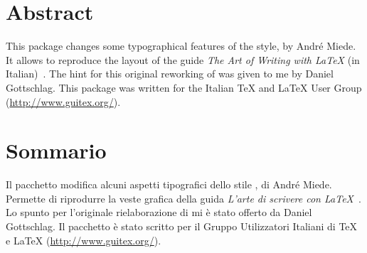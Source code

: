 
\begingroup
\let\clearpage\relax
\let\cleardoublepage\relax
\let\cleardoublepage\relax

\chapter*{Abstract}
This package changes some typographical features of the \classicthesis{} style, by André Miede. It allows to reproduce the layout of the guide \emph{The Art of Writing with \LaTeX} (in Italian)~\citep{pantieri:art}.  The hint for this original reworking of \classicthesis{} was given to me by Daniel Gottschlag. This package was written for the Italian \TeX{} and \LaTeX{} User Group (\url{http://www.guitex.org/}).

\vfill

\chapter*{Sommario}
Il pacchetto modifica alcuni aspetti tipografici dello stile \classicthesis, di André Miede. Permette di riprodurre la veste grafica della guida \emph{L'arte di scrivere con \LaTeX}~\citep{pantieri:art}. Lo spunto per l'originale rielaborazione di \classicthesis{} mi è stato offerto da Daniel Gottschlag. Il pacchetto \`e stato scritto per il Gruppo Utilizzatori Italiani di \TeX{} e \LaTeX{} (\url{http://www.guitex.org/}).


\endgroup			

\vfill

